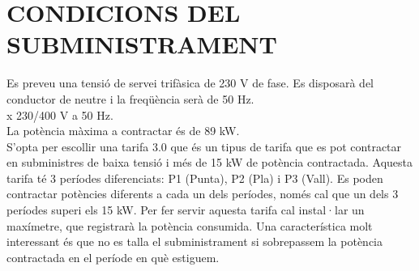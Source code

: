 \chapter{\uppercase{Condicions del subministrament}}
Es preveu una tensió de servei trifàsica de 230 V de fase. Es disposarà del conductor de neutre i la freqüència serà de 50 Hz.\\
 x 230/400 V a 50 Hz.\\
\newline
La potència màxima a contractar és de 89 kW.\\
\newline S'opta per escollir una tarifa 3.0 que és un tipus de tarifa que es pot contractar en subministres de baixa tensió i més de 15 kW de potència contractada. Aquesta tarifa té 3 períodes diferenciats: P1 (Punta), P2 (Pla) i P3 (Vall). Es poden contractar potències diferents a cada un dels períodes, només cal que un dels 3 períodes superi els 15 kW. Per fer servir aquesta tarifa cal instal·lar un maxímetre, que registrarà la potència consumida. Una característica molt interessant és que no es talla el subministrament si sobrepassem la potència contractada en el període en què estiguem.
\clearpage